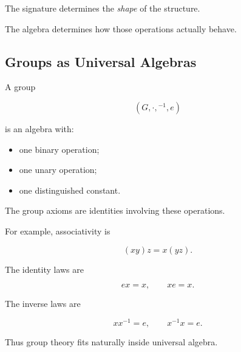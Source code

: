 \begin{center}
\end{center}

The signature determines the \emph{shape} of the structure.

The algebra determines how those operations actually behave.

\subsection{Groups as Universal Algebras}
\label{subsec:groups-universal-algebras}

A group

\[ (G,\cdot,{}^{-1},e) \]

is an algebra with:

\begin{itemize}
    \item one binary operation;
    \item one unary operation;
    \item one distinguished constant.
\end{itemize}

The group axioms are identities involving these operations.

For example, associativity is

\[ (xy)z=x(yz). \]

The identity laws are

\[ ex=x,\qquad xe=x. \]

The inverse laws are

\[ xx^{-1}=e,\qquad x^{-1}x=e. \]

Thus group theory fits naturally inside universal algebra.

